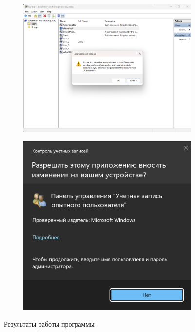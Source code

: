 \documentclass[a4paper, 14pt]{report}
\begin{document}
\begin{figure}[htbp]
\begin{subfigure}[c]{0.49\textwidth}
        \caption{}
    \end{subfigure}
    \hfill
    \begin{subfigure}[c]{0.49\textwidth}
        \includegraphics[width=\textwidth]{images/Screenshot 2024-12-23 at 14.52.10.png}
        \caption{}
    \end{subfigure}
    \hfill
    \begin{subfigure}[c]{0.39\textwidth}
        \includegraphics[width=\textwidth]{images/Screenshot 2024-12-23 at 14.52.30.png}
        \caption{}
    \end{subfigure}
    \caption{Результаты работы программы}
\end{figure}
\end{document}
